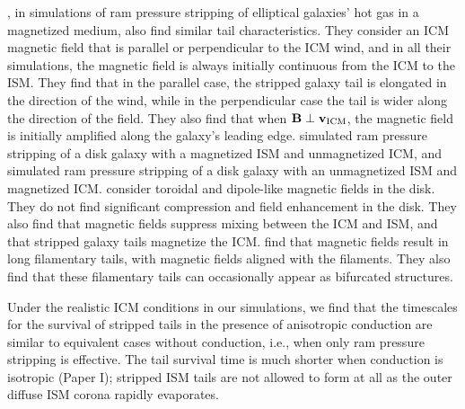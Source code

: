 \documentclass[twocolumn]{aastex6}
\begin{document}
\citet{Shin14}, in simulations of ram pressure stripping of elliptical galaxies' hot gas in a magnetized medium, also find similar tail characteristics. They consider an ICM magnetic field that is parallel or perpendicular to the ICM wind, and in all their simulations, the magnetic field is always initially continuous from the ICM to the ISM. They find that in the parallel case, the stripped galaxy tail is elongated in the direction of the wind, while in the perpendicular case the tail is wider along the direction of the field. They also find that when  $\mathbf{B} \perp \mathbf{v_{\rm ICM}}$, the magnetic field is initially amplified along the galaxy's leading edge. \citet{Tonnesen14} simulated ram pressure stripping of a disk galaxy with a magnetized ISM and unmagnetized ICM, and \citet{Ruszkowski14} simulated ram pressure stripping of a disk galaxy with an unmagnetized ISM and magnetized ICM. \citet{Tonnesen14} consider toroidal and dipole-like magnetic fields in the disk.
They do not find significant compression and field enhancement in the disk. They also find that magnetic fields suppress mixing between the ICM and ISM, and that stripped galaxy tails magnetize the ICM. \citet{Ruszkowski14} find that magnetic fields result in long filamentary tails, with magnetic fields aligned with the filaments. They also find that these filamentary tails can occasionally appear as bifurcated structures. 

Under the realistic ICM conditions in our simulations, we find that the timescales for the survival of stripped tails in the presence of anisotropic conduction are similar to equivalent cases without conduction, i.e., when only ram pressure stripping is effective. The tail survival time is much shorter when conduction is isotropic (Paper I); stripped ISM tails are not allowed to form at all as the outer diffuse ISM corona rapidly evaporates.
\end{document}
